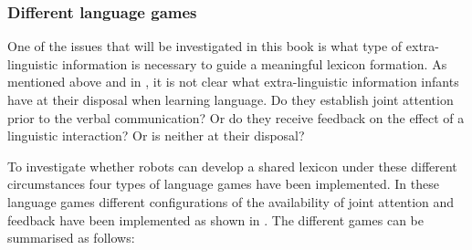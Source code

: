 \subsubsection{Different language games}

One of the issues that will be investigated in this book is what type of extra-linguistic information is necessary to guide a meaningful lexicon formation. As mentioned above and in , it is not clear what extra-linguistic information infants have at their disposal when learning language. Do they establish joint attention prior to the verbal communication? Or do they receive feedback on the effect of a linguistic interaction? Or is neither at their disposal? 

To investigate whether robots can develop a shared lexicon under these different circumstances four types of language games have been implemented. In these language games different configurations of the availability of joint attention and feedback have been implemented as shown in . The different games can be summarised as follows:

